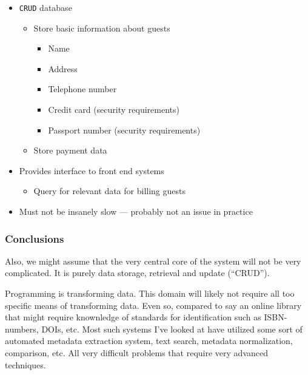 \begin{itemize}
  \begin{itemize}
  \tightlist
  \item
    \texttt{CRUD} database

    \begin{itemize}
    \tightlist
    \item
      Store basic information about guests

      \begin{itemize}
      \tightlist
      \item
        Name
      \item
        Address
      \item
        Telephone number
      \item
        Credit card (security requirements)
      \item
        Passport number (security requirements)
      \end{itemize}
    \item
      Store payment data
    \end{itemize}
  \item
    Provides interface to front end systems

    \begin{itemize}
    \tightlist
    \item
      Query for relevant data for billing guests
    \end{itemize}
  \item
    Must not be insanely slow --- probably not an issue in practice
  \end{itemize}
\end{itemize}



\subsubsection{Conclusions}
Also, we might assume that the very central core of the system will not be very
complicated. It is purely data storage, retrieval and update (``CRUD'').

Programming is transforming data. This domain will likely not require all too
specific means of transforming data.
Even so, compared to say an online library that might require knownledge of
standards for identification such as ISBN-numbers, DOIs, etc. Most such systems
I've looked at have utilized some sort of automated metadata extraction system,
text search, metadata normalization, comparison, etc. All very difficult
problems that require very advanced techniques.

